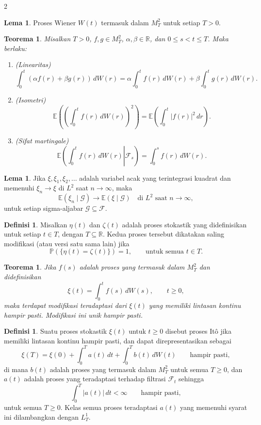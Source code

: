 \documentclass[a4paper,extrafontsizes, 9pt]{memoir}
\theoremstyle{definition}
\newtheorem{definisi}[kalstok]{Definisi}
\newtheorem{lemma}[kalstok]{Lema}
\theoremstyle{plain}
\newtheorem{teorema}[kalstok]{Teorema}
\theoremstyle{remark}
\begin{document}
\begin{multicols}{2}
  \begin{lemma}
    Proses Wiener $W(t)$ termasuk dalam $M_T^2$ untuk setiap $T>0$.
  \end{lemma}

  \begin{teorema}
    Misalkan $T>0$, $f,g\in M_T^2$, $\alpha,\beta\in\mathbb{R}$, dan $0\le s<t\le T$.
    Maka berlaku:
    \begin{enumerate}[leftmargin=*, itemsep=0.5mm]
      \item (Linearitas)
            \[\int_0^t (\alpha f(r)+\beta g(r))\,dW(r)
              =\alpha\int_0^t f(r)\,dW(r)+\beta\int_0^t g(r)\,dW(r).\]
      \item (Isometri)
            \[\mathbb{E}\left(\left(\int_0^t f(r)\,dW(r)\right)^2\right)
              =\mathbb{E}\left(\int_0^t |f(r)|^2\,dr\right).\]
      \item (Sifat martingale)
            \[\mathbb{E}\left(\left.\int_0^t f(r)\,dW(r)\right|\mathcal{F}_s\right)
              =\int_0^s f(r)\,dW(r).\]
    \end{enumerate}
  \end{teorema}

  \begin{lemma}
    Jika $\xi,\xi_1,\xi_2,\ldots$ adalah variabel acak yang terintegrasi kuadrat dan memenuhi
    $\xi_n\to\xi$ di $L^2$ saat $n\to\infty$, maka
    \[\mathbb{E}(\xi_n\mid\mathcal{G})\to\mathbb{E}(\xi\mid\mathcal{G})
      \quad \text{di }L^2 \text{ saat }n\to\infty,\]
    untuk setiap sigma-aljabar $\mathcal{G}\subseteq\mathcal{F}$.
  \end{lemma}

  \begin{definisi}
    Misalkan $\eta(t)$ dan $\zeta(t)$ adalah proses stokastik yang didefinisikan untuk setiap
    $t\in T$, dengan $T\subseteq\mathbb{R}$. Kedua proses tersebut dikatakan saling modifikasi
    (atau versi satu sama lain) jika
    \[\mathbb{P}(\{\eta(t)=\zeta(t)\})=1,\qquad \text{untuk semua }t\in T.\]
  \end{definisi}

  \begin{teorema}
    Jika $f(s)$ adalah proses yang termasuk dalam $M_T^2$ dan didefinisikan
    \[\xi(t)=\int_0^t f(s)\,dW(s),\qquad t\ge 0,\]
    maka terdapat modifikasi teradaptasi dari $\xi(t)$ yang memiliki lintasan kontinu hampir
    pasti. Modifikasi ini unik hampir pasti.
  \end{teorema}

  \begin{definisi}
    Suatu proses stokastik $\xi(t)$ untuk $t\ge 0$ disebut proses It\^o jika memiliki lintasan
    kontinu hampir pasti, dan dapat direpresentasikan sebagai
    \[\xi(T)=\xi(0)+\int_0^T a(t)\,dt+\int_0^T b(t)\,dW(t)\qquad \text{hampir pasti},\]
    di mana $b(t)$ adalah proses yang termasuk dalam $M_T^2$ untuk semua $T\ge 0$, dan $a(t)$
    adalah proses yang teradaptasi terhadap filtrasi $\mathcal{F}_t$ sehingga
    \[\int_0^T |a(t)|\,dt<\infty\qquad \text{hampir pasti},\]
    untuk semua $T\ge 0$. Kelas semua proses teradaptasi $a(t)$ yang memenuhi syarat ini
    dilambangkan dengan $L_T^1$.
  \end{definisi}


\end{multicols}
\end{document}
